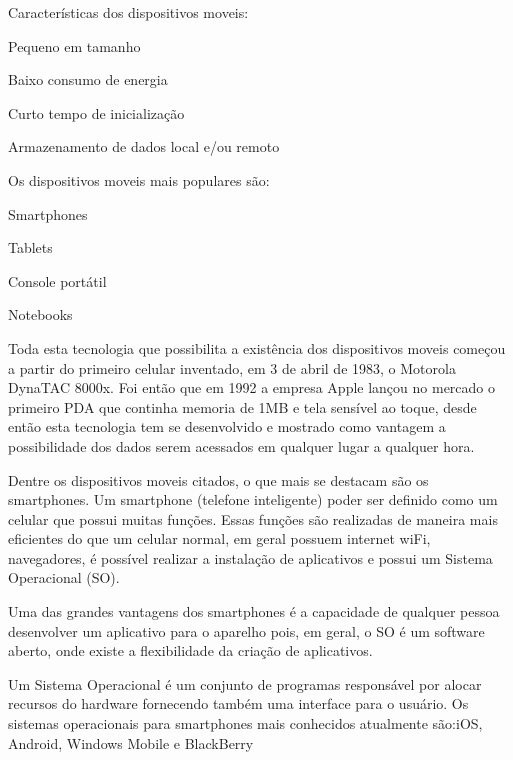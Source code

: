 Características dos dispositivos moveis:

\begin{alineascomponto}
 
\item Pequeno em tamanho
\item Baixo consumo de energia
\item Curto tempo de inicialização
\item Armazenamento de dados local e/ou remoto

	\end{alineascomponto}


Os dispositivos moveis mais populares são:

\begin{alineascomponto}
 
\item Smartphones
\item Tablets
\item Console portátil
\item Notebooks

	\end{alineascomponto}


Toda esta tecnologia que possibilita a existência dos dispositivos moveis começou a partir do primeiro celular inventado, em 3 de abril de 1983, o Motorola DynaTAC 8000x. Foi então que em 1992 a empresa Apple lançou no mercado o primeiro PDA que continha memoria de 1MB e tela sensível ao toque, desde então esta tecnologia tem se desenvolvido e mostrado como
vantagem  a possibilidade dos dados serem acessados em qualquer lugar a qualquer hora.

Dentre os dispositivos moveis citados, o que mais se destacam são os smartphones.
Um smartphone (telefone inteligente) poder ser definido como um celular que possui muitas funções. Essas funções são realizadas de maneira mais eficientes do que um celular normal, em geral possuem internet wiFi, navegadores, é possível realizar a instalação de aplicativos e possui um Sistema Operacional (SO). 

Uma das grandes vantagens dos smartphones é a capacidade de qualquer pessoa desenvolver um aplicativo para o aparelho pois, em geral, o SO é um software aberto, onde existe a flexibilidade da criação de aplicativos.

Um Sistema Operacional é um conjunto de programas responsável por alocar recursos do hardware fornecendo também uma interface para o usuário. Os sistemas operacionais para smartphones mais conhecidos atualmente são:iOS, Android, Windows Mobile e BlackBerry

